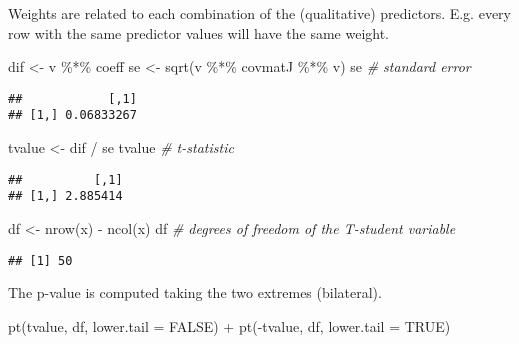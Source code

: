 \documentclass[
  oneside]{book}
\newenvironment{Shaded}{\begin{snugshade}}{\end{snugshade}}
\newcommand{\AttributeTok}[1]{\textcolor[rgb]{0.77,0.63,0.00}{#1}}
\newcommand{\CommentTok}[1]{\textcolor[rgb]{0.56,0.35,0.01}{\textit{#1}}}
\newcommand{\ConstantTok}[1]{\textcolor[rgb]{0.00,0.00,0.00}{#1}}
\newcommand{\FunctionTok}[1]{\textcolor[rgb]{0.00,0.00,0.00}{#1}}
\newcommand{\NormalTok}[1]{#1}
\newcommand{\OtherTok}[1]{\textcolor[rgb]{0.56,0.35,0.01}{#1}}
\newcommand{\SpecialCharTok}[1]{\textcolor[rgb]{0.00,0.00,0.00}{#1}}
\begin{document}
Weights are related to each combination of the (qualitative)
predictors. E.g. every row with the same predictor values will have
the same weight.

\begin{Shaded}
\begin{Highlighting}[]
\NormalTok{dif }\OtherTok{\textless{}{-}}\NormalTok{ v }\SpecialCharTok{\%*\%}\NormalTok{ coeff}
\NormalTok{se }\OtherTok{\textless{}{-}} \FunctionTok{sqrt}\NormalTok{(v }\SpecialCharTok{\%*\%}\NormalTok{ covmatJ }\SpecialCharTok{\%*\%}\NormalTok{ v)}
\NormalTok{se }\CommentTok{\# standard error}
\end{Highlighting}
\end{Shaded}

\begin{verbatim}
##            [,1]
## [1,] 0.06833267
\end{verbatim}

\begin{Shaded}
\begin{Highlighting}[]
\NormalTok{tvalue }\OtherTok{\textless{}{-}}\NormalTok{ dif }\SpecialCharTok{/}\NormalTok{ se}
\NormalTok{tvalue }\CommentTok{\# t{-}statistic}
\end{Highlighting}
\end{Shaded}

\begin{verbatim}
##          [,1]
## [1,] 2.885414
\end{verbatim}

\begin{Shaded}
\begin{Highlighting}[]
\NormalTok{df }\OtherTok{\textless{}{-}} \FunctionTok{nrow}\NormalTok{(x) }\SpecialCharTok{{-}} \FunctionTok{ncol}\NormalTok{(x)}
\NormalTok{df }\CommentTok{\# degrees of freedom of the T{-}student variable}
\end{Highlighting}
\end{Shaded}

\begin{verbatim}
## [1] 50
\end{verbatim}

The p-value is computed taking the two extremes (bilateral).

\begin{Shaded}
\begin{Highlighting}[]
\FunctionTok{pt}\NormalTok{(tvalue, df, }\AttributeTok{lower.tail =} \ConstantTok{FALSE}\NormalTok{) }\SpecialCharTok{+} \FunctionTok{pt}\NormalTok{(}\SpecialCharTok{{-}}\NormalTok{tvalue, df, }\AttributeTok{lower.tail =} \ConstantTok{TRUE}\NormalTok{)}
\end{Highlighting}
\end{Shaded}
\end{document}
